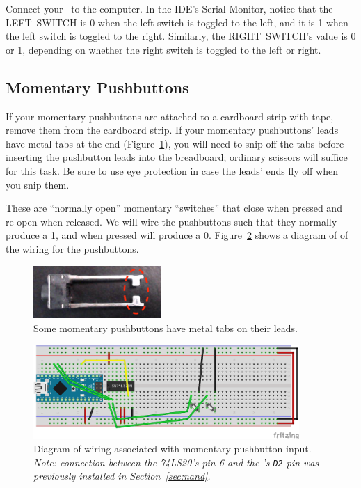 
Connect your \nano\ to the computer. In the IDE's Serial Monitor, notice that
the LEFT~SWITCH is 0 when the left switch is toggled to the left, and it is 1
when the left switch is toggled to the right. Similarly, the RIGHT~SWITCH's
value is 0 or 1, depending on whether the right switch is toggled to the left
or right.

\subsection{Momentary Pushbuttons}

If your momentary pushbuttons are attached to a cardboard strip with tape,
remove them from the cardboard strip. If your momentary pushbuttons' leads have
metal tabs at the end (Figure~\ref{fig:pushbutton-tabs}), you will need to
snip off the tabs before inserting the pushbutton leads into the breadboard;
ordinary scissors will suffice for this task. Be sure to use eye protection in
case the leads' ends fly off when you snip them.

These are ``normally open'' momentary ``switches'' that close when pressed and
re-open when released. We will wire the pushbuttons such that they normally
produce a 1, and when pressed will produce a 0.
Figure~\ref{fig:pushbutton-diagram} shows a diagram of of the wiring for the
pushbuttons.

\begin{figure}
    \centering
    \includegraphics[height=2cm]{pushbutton-tabs}
    \caption{Some momentary pushbuttons have metal tabs on their leads.\label{fig:pushbutton-tabs}}
\end{figure}

\begin{figure}
    \centering
    \includegraphics[width=0.9\textwidth]{fritzing_images/pushbutton}
    \caption{Diagram of wiring associated with momentary pushbutton input.
        \textit{Note: connection between the 74LS20's pin 6 and the \nano's
        \texttt{D2} pin was previously installed in Section~\ref{sec:nand}.}
        \label{fig:pushbutton-diagram}}
\end{figure}


